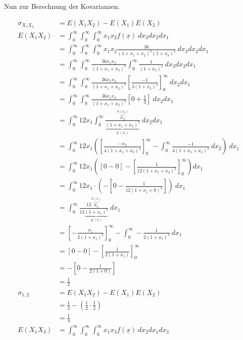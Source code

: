 \documentclass{article}
\begin{document}
Nun zur Berechnung der Kovarianzen.  

\begin{align*}
    \sigma_{X_1X_2} &= E(X_1X_2) - E(X_1) E(X_2) \\
    E(X_1X_2)&= \int_{0}^{\infty} \int_{0}^{\infty} \int_{0}^{\infty} x_1 x_2 f(\underline{x}) ~dx_3 dx_2 dx_1 \\
    &= \int_{0}^{\infty} \int_{0}^{\infty} \int_{0}^{\infty} x_1 x_2 \frac{36}{(1+x_1+x_2)^5(1+x_3)^4} ~ dx_3 dx_2 dx_1 \\
    &= \int_{0}^{\infty} \int_{0}^{\infty} \frac{36 x_1 x_2}{(1 + x_1 + x_2)^5} \int_{0}^{\infty}\frac{1}{(1+x_3)^4} ~ dx_3 dx_2 dx_1 \\
    &= \int_{0}^{\infty} \int_{0}^{\infty} \frac{36 x_1 x_2}{(1 + x_1 + x_2)^5} \left[\frac{-1}{3(1+x_3)^4}\right]_0^{\infty} ~ dx_2 dx_1 \\
    &= \int_{0}^{\infty} \int_{0}^{\infty} \frac{36 x_1 x_2}{(1 + x_1 + x_2)^5} \left[0 + \frac{1}{3}\right] ~ dx_2 dx_1 \\
    &= \int_{0}^{\infty}12x_1 \int_{0}^{\infty} \frac{\overbrace{x_2}^{h(x_2)}}{\underbrace{(1 + x_1 + x_2)^5}_{g'(x_2)}} ~ dx_2 dx_1 \\
    &= \int_{0}^{\infty}12x_1 \left(\left[\frac{-x_2}{4(1+x_1 + x_2)^4}\right]_0^{\infty}-\int_0^{\infty}  \frac{-1}{4(1+x_1 + x_2)^4} ~ dx_2\right) ~ dx_1\\
    &= \int_{0}^{\infty}12x_1 \left(\left[0-0\right] - \left[\frac{1}{12(1+x_1+x_2)^3}\right]_0^{\infty}\right) dx_1 \\
    &= \int_{0}^{\infty}12x_1 \cdot \left(- \left[0 - \frac{1}{12(1 + x_1 + 0)^3}\right]\right) ~ dx_1 \\
    &= \int_{0}^{\infty}\frac{12\overbrace{x_1}^{h(x)}}{12\underbrace{(1 + x_1)^3}_{g'(x)}} ~ dx_1 \\
    &= \left[-\frac{x_1}{2(1+x_1)^2} \right]^{\infty}_0 - \int_{0}^{\infty}-\frac{1}{2(1+x_1)^2} ~ dx_1 \\
    &= \left[0 - 0\right] - \left[\frac{1}{2(1 + x_1)}\right]_0^{\infty} \\
    &= -\left[0 - \frac{1}{2(1+0)} \right] \\
    &= \frac{1}{2}\\
    \sigma_{1,2} &= E(X_1X_2) - E(X_1)E(X_2) \\
    &= \frac{1}{2} - \left(\frac{1}{2}\cdot \frac{1}{2}\right) \\
    &= \frac{1}{4} \\
    E(X_1X_3)&= \int_{0}^{\infty} \int_{0}^{\infty} \int_{0}^{\infty} x_1 x_3 f(\underline{x}) ~dx_2 dx_1 dx_3  \\

\end{align*}
\end{document}
